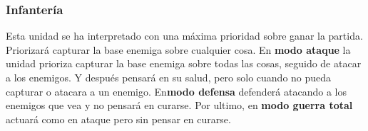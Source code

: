 \subsubsection{Infantería}

Esta unidad se ha interpretado con una máxima prioridad sobre ganar la partida. Priorizará capturar la base enemiga sobre cualquier cosa. En \textbf{modo ataque} la unidad prioriza capturar la base enemiga sobre todas las cosas, seguido de atacar a los enemigos. Y después pensará en su salud, pero solo cuando no pueda capturar o atacara a un enemigo. En\textbf{modo defensa} defenderá atacando a los enemigos que vea y no pensará en curarse. Por ultimo, en \textbf{modo guerra total} actuará como en ataque pero sin pensar en curarse.

\begin{figure}[H]
    \centering
\end{figure}
